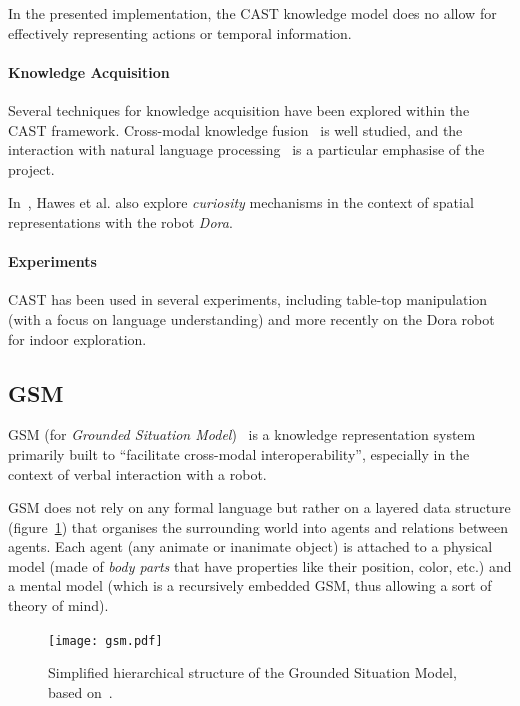 \documentclass[a4paper, twocolumn]{article}
\begin{document}
In the presented implementation, the CAST knowledge model does no allow for
effectively representing actions or temporal information.

\paragraph{Knowledge Acquisition} Several techniques for knowledge acquisition
have been explored within the CAST framework. Cross-modal knowledge
fusion~\cite{Hawes2007a} is well studied, and the interaction with natural
language processing~\cite{Kruijff2010, Kruijff2010a} is a particular emphasise
of the project.

In~\cite{Hawes2011}, Hawes et al. also explore \emph{curiosity} mechanisms in
the context of spatial representations with the robot \emph{Dora}.

\paragraph{Experiments} CAST has been used in several experiments, including
table-top manipulation (with a focus on language understanding) and more
recently on the Dora robot~\cite{Hawes2011} for indoor exploration.

\subsection{GSM}
\label{sect|gsm}

GSM (for \emph{Grounded Situation Model})~\cite{Mavridis2006} is a knowledge
representation system primarily built to ``facilitate cross-modal
interoperability'',  especially in the context of verbal interaction with a
robot.

GSM does not rely on any formal language but rather on a layered data structure
(figure~\ref{fig|gsm}) that organises the surrounding world into agents and
relations between agents.  Each agent (any animate or inanimate object) is
attached to a physical model (made of \emph{body parts} that have properties
like their position, color, etc.) and a mental model (which is a recursively
embedded GSM, thus allowing a sort of theory of mind).

\begin{figure}
    \centering
    \texttt{[image: gsm.pdf]}

    \caption{Simplified hierarchical structure of the Grounded Situation Model,
    based on~\cite{Mavridis2006}.}

    \label{fig|gsm}
\end{figure}
\end{document}
